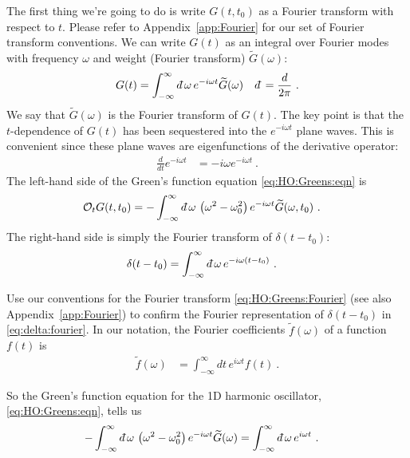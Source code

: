 The first thing we're going to do is write $G(t,t_0)$ as a Fourier transform with respect to $t$. Please refer to Appendix~\ref{app:Fourier} for our set of Fourier transform conventions. We can write $G(t)$ as an integral over Fourier modes with frequency $\omega$ and weight (Fourier transform) $\tilde G(\omega)$:
\begin{align}
	G(t) &= \int_{-\infty}^\infty\dbar \omega \, e^{-i\omega t} \tilde G(\omega) 
	&
	\dbar = \frac{d}{2\pi}
	\ .
	\label{eq:HO:Greens:Fourier}
\end{align}
We say that $\tilde G(\omega)$ is the Fourier transform of $G(t)$. The key point is that the $t$-dependence of $G(t)$ has been sequestered into the $e^{-i\omega t}$ plane waves. This is convenient since these plane waves are eigenfunctions of the derivative operator:
\begin{align}
	\frac{d}{dt} e^{-i\omega t} &= -i\omega e^{-i\omega t} \ .
\end{align}
The left-hand side of the Green's function equation \eqref{eq:HO:Greens:eqn} is
\begin{align}
	\mathcal O_t G(t,t_0) 
	&= 
	-
	\int_{-\infty}^\infty \dbar \omega \, 
	\left(\omega^2-\omega_0^2\right) e^{-i\omega t} \tilde G(\omega,t_0) \ .
\end{align}
The right-hand side is simply the Fourier transform of $\delta(t-t_0)$:
\begin{align}
	\delta(t-t_0)
	&=
	\int_{-\infty}^\infty \dbar \omega \, e^{-i\omega (t-t_0)} \ .
	\label{eq:delta:fourier}
\end{align}
\begin{exercise}
Use our conventions for the Fourier transform \eqref{eq:HO:Greens:Fourier} (see also Appendix~\ref{app:Fourier}) to confirm the Fourier representation of $\delta(t-t_0)$ in \eqref{eq:delta:fourier}. In our notation, the Fourier coefficients $\tilde f(\omega)$ of a function $f(t)$ is
\begin{align}
	\tilde f(\omega) &= 
	\int_{-\infty}^\infty d t\, e^{i\omega t} f(t) \ .
\end{align}
\end{exercise}
So the Green's function equation for the 1D harmonic oscillator, \eqref{eq:HO:Greens:eqn}, tells us
\begin{align}
	-
	\int_{-\infty}^\infty \dbar \omega \, 
	\left(\omega^2-\omega_0^2\right) e^{-i\omega t} \tilde G(\omega)
	&=
	\int_{-\infty}^\infty \dbar \omega \, e^{i\omega t}
	\ .
	\label{eq:G:HO:Fourier:equation:integrals}
\end{align}
